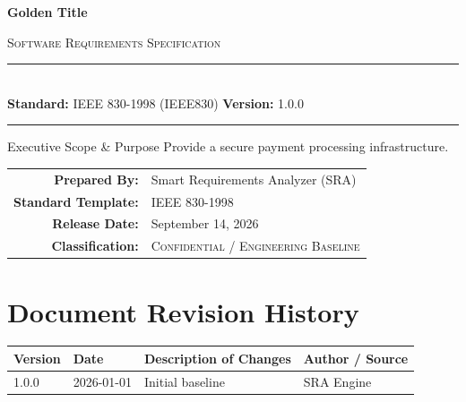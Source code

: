 \documentclass[11pt,a4paper]{article}
\begin{document}
\begin{titlepage}
    \centering
    \vspace*{1.5cm}
    {\Huge\bfseries\sffamily\textcolor{sraprimary}{Golden Title} \par}
    \vspace{0.6cm}
    {\Large\textsc{\textcolor{sraaccent}{Software Requirements Specification}} \par}
    \vspace{1.2cm}
    {\color{slateborder}\rule{\linewidth}{1.2pt}}\\[0.4cm]
    {\large \textbf{Standard:} IEEE 830-1998 (IEEE830) \quad \textbf{Version:} 1.0.0}\\[0.2cm]
    {\color{slateborder}\rule{\linewidth}{1.2pt}}
    \vspace{1.8cm}

    \begin{infobox}{Executive Scope \& Purpose}
        Provide a secure payment processing infrastructure.
    \end{infobox}

    \vfill
    \begin{tabularx}{0.85\linewidth}{rX}
        \textbf{Prepared By:} & Smart Requirements Analyzer (SRA) \\
        \textbf{Standard Template:} & IEEE 830-1998 \\
        \textbf{Release Date:} & September 14, 2026 \\
        \textbf{Classification:} & \textsc{Confidential / Engineering Baseline} \\
    \end{tabularx}
    \vspace{1cm}
\end{titlepage}

\tableofcontents
\newpage

\section*{Document Revision History}
\begin{table}[h!]
\centering
\begin{tabularx}{\linewidth}{l l X l}
\toprule
\textbf{Version} & \textbf{Date} & \textbf{Description of Changes} & \textbf{Author / Source} \\
\midrule
1.0.0 & 2026-01-01 & Initial baseline & SRA Engine \\
\bottomrule
\end{tabularx}
\end{table}
\vspace{1cm}
\end{document}
